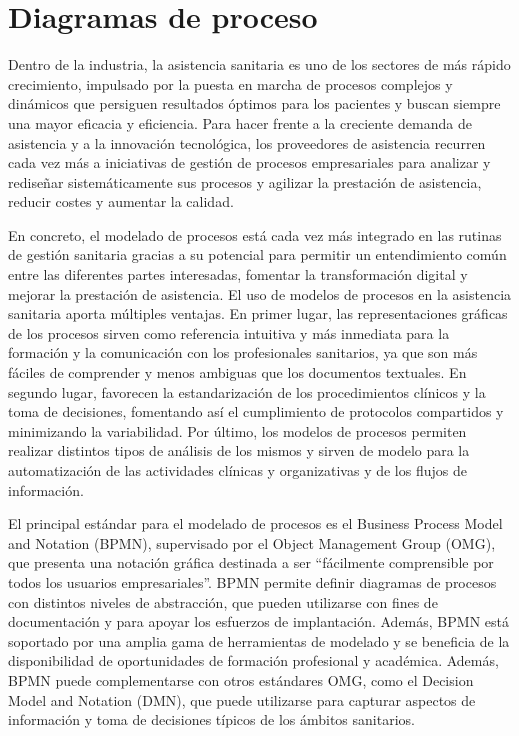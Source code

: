 \section{Diagramas de proceso}

Dentro de la industria, la asistencia sanitaria es uno de los sectores de más rápido crecimiento, impulsado por la puesta en marcha de procesos complejos y dinámicos que persiguen resultados óptimos para los pacientes y buscan siempre una mayor eficacia y eficiencia.
Para hacer frente a la creciente demanda de asistencia y a la innovación tecnológica, los proveedores de asistencia recurren cada vez más a iniciativas de gestión de procesos empresariales para analizar y rediseñar sistemáticamente sus procesos y agilizar la prestación de asistencia, reducir costes y aumentar la calidad.

En concreto, el modelado de procesos está cada vez más integrado en las rutinas de gestión sanitaria gracias a su potencial para permitir un entendimiento común entre las diferentes partes interesadas, fomentar la transformación digital y mejorar la prestación de asistencia.
El uso de modelos de procesos en la asistencia sanitaria aporta múltiples ventajas.
En primer lugar, las representaciones gráficas de los procesos sirven como referencia intuitiva y más inmediata para la formación y la comunicación con los profesionales sanitarios, ya que son más fáciles de comprender y menos ambiguas que los documentos textuales.
En segundo lugar, favorecen la estandarización de los procedimientos clínicos y la toma de decisiones, fomentando así el cumplimiento de protocolos compartidos y minimizando la variabilidad.
Por último, los modelos de procesos permiten realizar distintos tipos de análisis de los mismos y sirven de modelo para la automatización de las actividades clínicas y organizativas y de los flujos de información.

El principal estándar para el modelado de procesos es el Business Process Model and Notation (BPMN), supervisado por el Object Management Group (OMG), que presenta una notación gráfica destinada a ser ``fácilmente comprensible por todos los usuarios empresariales''. BPMN permite definir diagramas de procesos con distintos niveles de abstracción, que pueden utilizarse con fines de documentación y para apoyar los esfuerzos de implantación. Además, BPMN está soportado por una amplia gama de herramientas de modelado y se beneficia de la disponibilidad de oportunidades de formación profesional y académica. Además, BPMN puede complementarse con otros estándares OMG, como el Decision Model and Notation (DMN), que puede utilizarse para capturar aspectos de información y toma de decisiones típicos de los ámbitos sanitarios.

